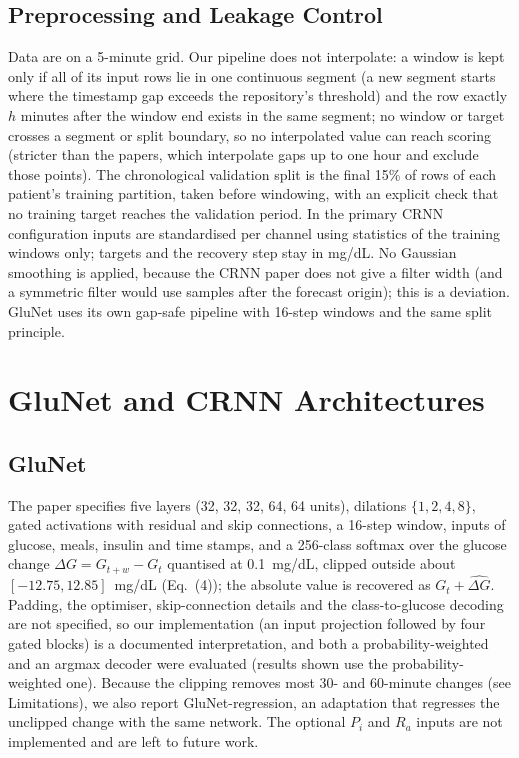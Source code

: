 \documentclass[conference]{IEEEtran}
\begin{document}
\subsection{Preprocessing and Leakage Control}
Data are on a 5-minute grid. Our pipeline does not interpolate: a window is kept only if all of its input rows lie in one continuous segment (a new segment starts where the timestamp gap exceeds the repository's threshold) and the row exactly $h$ minutes after the window end exists in the same segment; no window or target crosses a segment or split boundary, so no interpolated value can reach scoring (stricter than the papers, which interpolate gaps up to one hour and exclude those points). The chronological validation split is the final 15\% of rows of each patient's training partition, taken before windowing, with an explicit check that no training target reaches the validation period. In the primary CRNN configuration inputs are standardised per channel using statistics of the training windows only; targets and the recovery step stay in mg/dL. No Gaussian smoothing is applied, because the CRNN paper does not give a filter width (and a symmetric filter would use samples after the forecast origin); this is a deviation. GluNet uses its own gap-safe pipeline with 16-step windows and the same split principle.

\section{GluNet and CRNN Architectures}
\subsection{GluNet}
The paper specifies five layers (32, 32, 32, 64, 64 units), dilations $\{1,2,4,8\}$, gated activations with residual and skip connections, a 16-step window, inputs of glucose, meals, insulin and time stamps, and a 256-class softmax over the glucose change $\Delta G=G_{t+w}-G_t$ quantised at 0.1~mg/dL, clipped outside about $[-12.75,12.85]$~mg/dL (Eq.~(4)); the absolute value is recovered as $G_t+\widehat{\Delta G}$. Padding, the optimiser, skip-connection details and the class-to-glucose decoding are not specified, so our implementation (an input projection followed by four gated blocks) is a documented interpretation, and both a probability-weighted and an argmax decoder were evaluated (results shown use the probability-weighted one). Because the clipping removes most 30- and 60-minute changes (see Limitations), we also report GluNet-regression, an adaptation that regresses the unclipped change with the same network. The optional $P_i$ and $R_a$ inputs are not implemented and are left to future work.
\end{document}
